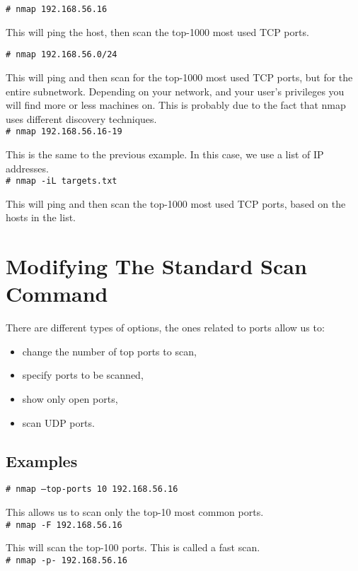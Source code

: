 \documentclass[twocolumn]{article}
\begin{document}
\texttt{\# nmap 192.168.56.16}

This will ping the host, then scan the top-1000 most used TCP ports.

\texttt{\# nmap 192.168.56.0/24}

This will ping and then scan for the top-1000 most used TCP ports, but for the entire subnetwork. Depending on your network, and your user's privileges you will find more or less machines on. This is probably due to the fact that nmap uses different discovery techniques.\\

\texttt{\# nmap 192.168.56.16-19}

This is the same to the previous example. In this case, we use a list of IP addresses.\\

\texttt{\# nmap -iL targets.txt}

This will ping and then scan the top-1000 most used TCP ports, based on the hosts in the list.

\section{Modifying The Standard Scan Command}

There are different types of options, the ones related to ports allow us to:

\begin{itemize}
    \item change the number of top ports to scan,
    \item specify ports to be scanned,
    \item show only open ports,
    \item scan UDP ports.
\end{itemize}

\subsection{Examples}

\texttt{\# nmap --top-ports 10 192.168.56.16}

This allows us to scan only the top-10 most common ports.\\

\texttt{\# nmap -F 192.168.56.16}

This will scan the top-100 ports. This is called a fast scan.\\

\texttt{\# nmap -p- 192.168.56.16}
\end{document}
